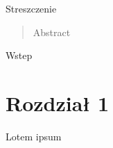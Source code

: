 \documentclass[oik,pdftex]{mgrwms}
\begin{document}
% 
\tableofcontents
\begin{streszczenie}
Streszczenie
 

\end{streszczenie}
\begin{abstract}
Abstract

\end{abstract}
\begin{wstep}    %
Wstep

% 
\end{wstep}

\chapter{Rozdział 1}

Lotem ipsum

\mgrclosechapter

%  
\begin{thebibliography}{88}
\end{thebibliography}
\end{document}
